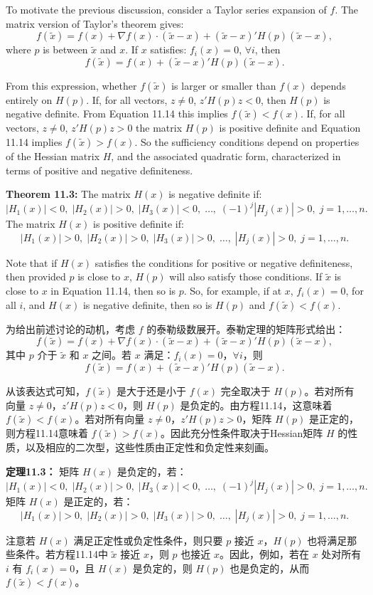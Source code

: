 \begin{original}
To motivate the previous discussion, consider a Taylor series expansion of $f$. The matrix version of Taylor's theorem gives:
\[
f(\tilde{x}) = f(x) + \nabla f(x) \cdot (\tilde{x} - x) + (\tilde{x} - x)'H(p)(\tilde{x} - x),
\]
where $p$ is between $\tilde{x}$ and $x$. If $x$ satisfies: $f_i(x) = 0$, $\forall i$, then
\[
f(\tilde{x}) = f(x) + (\tilde{x} - x)'H(p)(\tilde{x} - x). \tag{11.14}
\]

From this expression, whether $f(\tilde{x})$ is larger or smaller than $f(x)$ depends entirely on $H(p)$. If, for all vectors, $z \neq 0$, $z'H(p)z < 0$, then $H(p)$ is negative definite. From Equation 11.14 this implies $f(\tilde{x}) < f(x)$. If, for all vectors, $z \neq 0$, $z'H(p)z > 0$ the matrix $H(p)$ is positive definite and Equation 11.14 implies $f(\tilde{x}) > f(x)$. So the sufficiency conditions depend on properties of the Hessian matrix $H$, and the associated quadratic form, characterized in terms of positive and negative definiteness.

\textbf{Theorem 11.3:} The matrix $H(x)$ is negative definite if:
\[
|H_1(x)| < 0,\; |H_2(x)| > 0,\; |H_3(x)| < 0,\; \ldots,\; (-1)^j|H_j(x)| > 0,\; j = 1,\ldots,n.
\]
The matrix $H(x)$ is positive definite if:
\[
|H_1(x)| > 0,\; |H_2(x)| > 0,\; |H_3(x)| > 0,\; \ldots,\; |H_j(x)| > 0,\; j = 1,\ldots,n.
\]

Note that if $H(x)$ satisfies the conditions for positive or negative definiteness, then provided $p$ is close to $x$, $H(p)$ will also satisfy those conditions. If $\tilde{x}$ is close to $x$ in Equation 11.14, then so is $p$. So, for example, if at $x$, $f_i(x) = 0$, for all $i$, and $H(x)$ is negative definite, then so is $H(p)$ and $f(\tilde{x}) < f(x)$.
\end{original}
\begin{translation}
为给出前述讨论的动机，考虑 $f$ 的泰勒级数展开。泰勒定理的矩阵形式给出：
\[
f(\tilde{x}) = f(x) + \nabla f(x) \cdot (\tilde{x} - x) + (\tilde{x} - x)'H(p)(\tilde{x} - x),
\]
其中 $p$ 介于 $\tilde{x}$ 和 $x$ 之间。若 $x$ 满足：$f_i(x) = 0$，$\forall i$，则
\[
f(\tilde{x}) = f(x) + (\tilde{x} - x)'H(p)(\tilde{x} - x). \tag{11.14}
\]

从该表达式可知，$f(\tilde{x})$ 是大于还是小于 $f(x)$ 完全取决于 $H(p)$。若对所有向量 $z \neq 0$，$z'H(p)z < 0$，则 $H(p)$ 是负定的。由方程11.14，这意味着 $f(\tilde{x}) < f(x)$。若对所有向量 $z \neq 0$，$z'H(p)z > 0$，矩阵 $H(p)$ 是正定的，则方程11.14意味着 $f(\tilde{x}) > f(x)$。因此充分性条件取决于Hessian矩阵 $H$ 的性质，以及相应的二次型，这些性质由正定性和负定性来刻画。

\textbf{定理11.3：} 矩阵 $H(x)$ 是负定的，若：
\[
|H_1(x)| < 0,\; |H_2(x)| > 0,\; |H_3(x)| < 0,\; \ldots,\; (-1)^j|H_j(x)| > 0,\; j = 1,\ldots,n.
\]
矩阵 $H(x)$ 是正定的，若：
\[
|H_1(x)| > 0,\; |H_2(x)| > 0,\; |H_3(x)| > 0,\; \ldots,\; |H_j(x)| > 0,\; j = 1,\ldots,n.
\]

注意若 $H(x)$ 满足正定性或负定性条件，则只要 $p$ 接近 $x$，$H(p)$ 也将满足那些条件。若方程11.14中 $\tilde{x}$ 接近 $x$，则 $p$ 也接近 $x$。因此，例如，若在 $x$ 处对所有 $i$ 有 $f_i(x) = 0$，且 $H(x)$ 是负定的，则 $H(p)$ 也是负定的，从而 $f(\tilde{x}) < f(x)$。
\end{translation}

